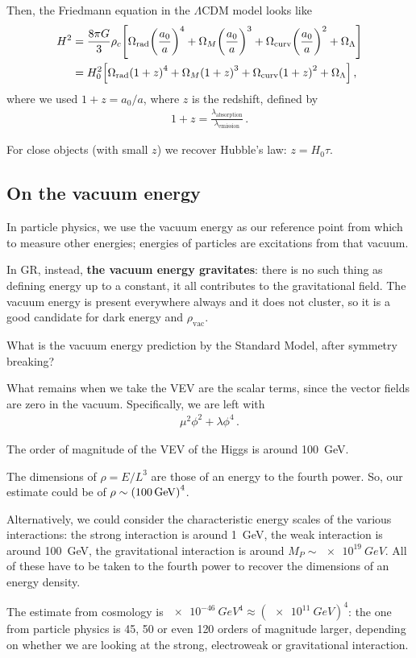 \documentclass[main.tex]{subfiles}
\begin{document}
Then, the Friedmann equation in the \(\Lambda \)CDM model looks like 
%
\begin{align}
H^2 &= \frac{8 \pi G}{3} \rho_{c}
\qty[
    \Omega_{\text{rad}} \qty(\frac{a_0 }{a})^4    
    +\Omega_{M} \qty(\frac{a_0 }{a})^3    
    +\Omega_{\text{curv}} \qty(\frac{a_0 }{a})^2    
    +\Omega_\Lambda    
]  \\
&= H_0^2 \qty[
    \Omega_{\text{rad}} \qty(1 + z)^4    
    +\Omega_{M} \qty(1 + z)^3    
    +\Omega_{\text{curv}} \qty(1 + z)^2    
    +\Omega_\Lambda    
]
\,,
\end{align}
%
where we used \(1 + z = a_0 / a\), where \(z\) is the redshift, defined by 
%
\begin{align}
1 + z = \frac{\lambda _{\text{absorption}}}{\lambda _{\text{emission}}}
\,.
\end{align}

For close objects (with small \(z\)) we recover Hubble's law: \(z = H_0 \tau \).

\subsection{On the vacuum energy}

In particle physics, we use the vacuum energy as our reference point from which to measure other energies; energies of particles are excitations from that vacuum. 

In GR, instead, \textbf{the vacuum energy gravitates}: there is no such thing as defining energy up to a constant, it all contributes to the gravitational field. 
The vacuum energy is present everywhere always and it does not cluster, so it is a good candidate for dark energy and \(\rho _{\text{vac}}\).

What is the vacuum energy prediction by the Standard Model, after symmetry breaking?

What remains when we take the VEV are the scalar terms, since the vector fields are zero in the vacuum. Specifically, we are left with 
%
\begin{align}
\mu^2 \phi^2 + \lambda \phi^{4}
\,.
\end{align}

The order of magnitude of the VEV of the Higgs is around \SI{100}{GeV}. 

The dimensions of \(\rho = E / L^3\) are those of an energy to the fourth power.
So, our estimate could be of \(\rho \sim \qty(\SI{100}{GeV})^{4}\). 

Alternatively, we could consider the characteristic energy scales of the various interactions: the strong interaction is around \SI{1}{GeV}, the weak interaction is around \SI{100}{GeV}, the gravitational interaction is around \(M_P \sim \SI{e19}{GeV}\).
All of these have to be taken to the fourth power to recover the dimensions of an energy density. 

The estimate from cosmology is \(\SI{e-46}{GeV^{4}} \approx (\SI{e11}{GeV})^{4}\): the one from particle physics is 45, 50 or even 120 orders of magnitude larger, depending on whether we are looking at the strong, electroweak or gravitational interaction.
\end{document}
